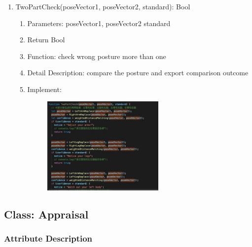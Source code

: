 \documentclass[16pt]{scrreprt}
\begin{document}
\begin{enumerate}
    \item TwoPartCheck(poseVector1, poseVector2, standard): Bool
        \begin{enumerate}
            \item Parameters: poseVector1, poseVector2 standard
            \item Return Bool
            \item Function: check wrong posture more than one
            \item Detail Description: compare the posture and export comparison outcome
            \item Implement:
                \begin{figure}[H]
                    \centering
                    \includegraphics[width=0.6\textwidth]{diagrams/correction-1.jpg}\\
                \end{figure}
        \end{enumerate}
\end{enumerate}

\subsection{Class: Appraisal}
\subsubsection{Attribute Description}
\end{document}
